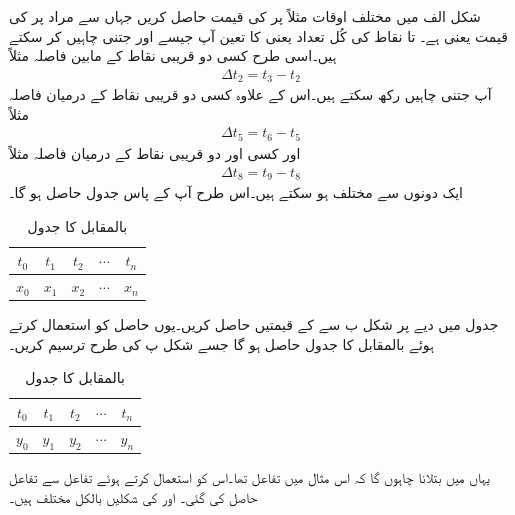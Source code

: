 شکل   الف میں مختلف اوقات مثلاً   پر  کی قیمت حاصل کریں جہاں   سے مراد  پر  کی قیمت یعنی  ہے۔ تا  نقاط کی کُل تعداد  یعنی   کا تعین آپ جیسے اور جتنی چاہیں کر سکتے ہیں۔اسی طرح کسی دو قریبی نقاط کے مابین فاصلہ مثلاً
\begin{align*}
\Delta t_2=t_3 -t_2
\end{align*}
آپ جتنی چاہیں رکھ سکتے ہیں۔اس کے علاوہ کسی دو قریبی نقاط کے درمیان فاصلہ مثلاً 
\begin{align*}
\Delta t_5=t_6-t_5
\end{align*}
اور کسی اور دو قریبی نقاط کے درمیان فاصلہ  مثلاً
\begin{align*}
\Delta t_8=t_9-t_8
\end{align*}
ایک دونوں سے مختلف ہو سکتے ہیں۔اس طرح آپ کے پاس جدول  حاصل ہو گا۔
\begin{table} [h]
\caption{ بالمقابل   کا جدول}
\label{جدول_ایکس_بالمقابل_ٹی}
\centering
\begin{LTR}
\begin{tabular}{c c c c c }
$ t_0 $ & $ t_1 $ & $ t_2 $ & $\cdots$ & $ t_n $ \\
\midrule
$ x_0 $ & $ x_1 $ & $ x_2 $ & $\cdots$ & $ x_n $ \\
\end{tabular}
\end{LTR}
\end{table}

جدول  میں دیے  پر شکل  ب سے  کے قیمتیں حاصل کریں۔یوں حاصل   کو استعمال کرتے ہوئے  بالمقابل  کا جدول  حاصل ہو گا جسے شکل  پ کی طرح ترسیم کریں۔

\begin{table} [h]
\caption{ بالمقابل   کا جدول}
\label{جدول_وائے_بالمقابل_ٹی}
\centering
\begin{LTR}
\begin{tabular}{c c c c c }
$ t_0 $ & $ t_1 $ & $ t_2 $ & $\cdots$ & $ t_n $ \\
\midrule
$ y_0 $ & $ y_1 $ & $ y_2 $ & $\cdots$ & $ y_n $ \\
\end{tabular}
\end{LTR}
\end{table}
یہاں میں بتلانا چاہوں گا کہ اس مثال میں تفاعل    تھا۔اس کو استعمال کرتے ہوئے تفاعل  سے تفاعل  حاصل کی گئی۔  اور  کی شکلیں بالکل مختلف ہیں۔

